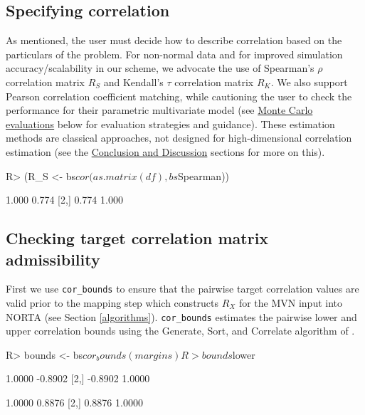 \documentclass[
]{jss}
\begin{document}
\hypertarget{specifying-correlation}{%
\subsection{Specifying correlation}\label{specifying-correlation}}

As mentioned, the user must decide how to describe correlation based on the particulars of the problem. For non-normal data and for improved simulation accuracy/scalability in our scheme, we advocate the use of Spearman's \(\rho\) correlation matrix \(R_S\) and Kendall's \(\tau\) correlation matrix \(R_K\). We also support Pearson correlation coefficient matching, while cautioning the user to check the performance for their parametric multivariate model (see \protect\hyperlink{simulations}{Monte Carlo evaluations} below for evaluation strategies and guidance). These estimation methods are classical approaches, not designed for high-dimensional correlation estimation (see the \href{\%7B\#discussion}{Conclusion and Discussion} sections for more on this).

\begin{CodeChunk}
\begin{CodeInput}
R> (R_S <- bs$cor(as.matrix(df), bs$Spearman))
\end{CodeInput}
\begin{CodeOutput}
      [,1]  [,2]
[1,] 1.000 0.774
[2,] 0.774 1.000
\end{CodeOutput}
\end{CodeChunk}

\hypertarget{checking-target-correlation-matrix-admissibility}{%
\subsection{Checking target correlation matrix admissibility}\label{checking-target-correlation-matrix-admissibility}}

First we use \texttt{cor\_bounds} to ensure that the pairwise target correlation values are valid prior to the mapping step which constructs \(R_X\) for the MVN input into NORTA (see Section \ref{algorithms}). \texttt{cor\_bounds} estimates the pairwise lower and upper correlation bounds using the Generate, Sort, and Correlate algorithm of \citet{DH2011}.

\begin{CodeChunk}
\begin{CodeInput}
R> bounds <- bs$cor_bounds(margins)
R> bounds$lower
\end{CodeInput}
\begin{CodeOutput}
        [,1]    [,2]
[1,]  1.0000 -0.8902
[2,] -0.8902  1.0000
\end{CodeOutput}
\begin{CodeOutput}
       [,1]   [,2]
[1,] 1.0000 0.8876
[2,] 0.8876 1.0000
\end{CodeOutput}
\end{CodeChunk}
\end{document}
